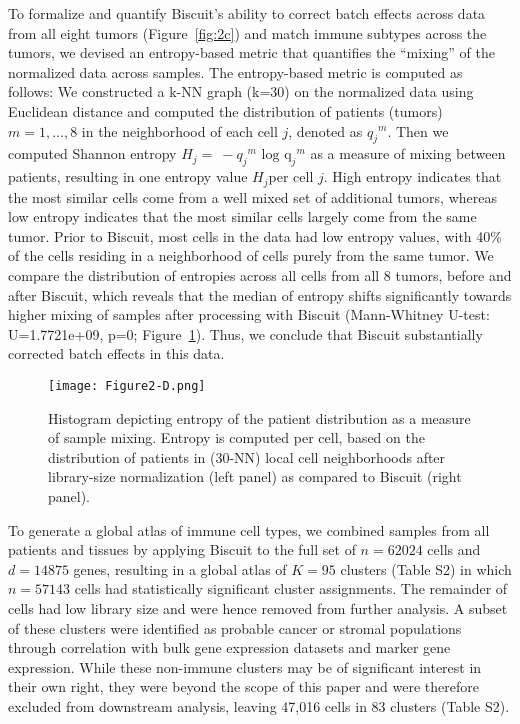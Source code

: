 To formalize and quantify Biscuit's ability to correct batch effects across data from all eight tumors (Figure~\ref{fig:2c}) and match immune subtypes across the tumors, we devised an entropy-based metric that quantifies the ``mixing'' of the normalized data across samples. 
The entropy-based metric is computed as follows: We constructed a k-NN graph (k=30) on the normalized data using Euclidean distance and computed the distribution of patients (tumors) \(m = 1,\ldots,8\) in the neighborhood of each cell \(j\), denoted as \({q_{j}}^{m}\). 
Then we computed Shannon entropy \(H_{j} = \  - {q_{j}}^{m}\text{\ log}{\text{\ q}_{j}}^{m}\) as a measure of mixing between patients, resulting in one entropy value \(H_{j}\)per cell \(j\). 
High entropy indicates that the most similar cells come from a well mixed set of additional tumors, whereas low entropy indicates that the most similar cells largely come from the same tumor. 
Prior to Biscuit, most cells in the data had low entropy values, with 40\% of the cells residing in a neighborhood of cells purely from the same tumor.
We compare the distribution of entropies across all cells from all 8 tumors, before and after Biscuit, which reveals that the median of entropy shifts significantly towards higher mixing of samples after processing with Biscuit (Mann-Whitney U-test: U=1.7721e+09, p=0; Figure~\ref{fig:2d}). 
Thus, we conclude that Biscuit substantially corrected batch effects in this data.

\begin{figure}
\centering
\texttt{[image: Figure2-D.png]}
\caption{Histogram depicting entropy of the patient distribution as a measure of sample mixing. Entropy is computed per cell, based on the distribution of patients in (30-NN) local cell neighborhoods after library-size normalization (left panel) as compared to Biscuit (right panel).  
}
\label{fig:2d}
\end{figure}

To generate a global atlas of immune cell types, we combined samples from all patients and tissues by applying Biscuit to the full set of $n=62024$ cells and $d=14875$ genes, resulting in a global atlas of $K=95$ clusters (Table S2) in which $n=57143$ cells had statistically significant cluster assignments.  %
The remainder of cells had low library size and were hence removed from further analysis. %
A subset of these clusters were identified as probable cancer or stromal populations through correlation with bulk gene expression datasets and marker gene expression. 
While these non-immune clusters may be of significant interest in their own right, they were beyond the scope of this paper and were therefore excluded from downstream analysis, leaving 47,016 cells in 83 clusters (Table S2). %

